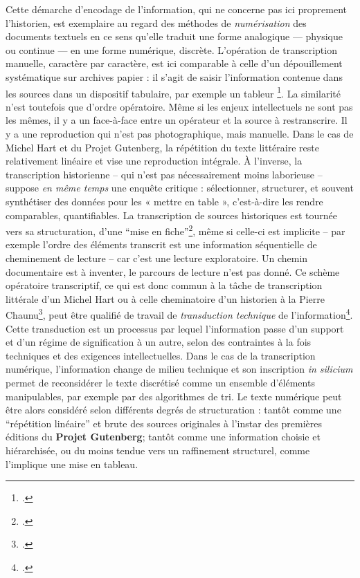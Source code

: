 Cette démarche d'encodage de l'information, qui ne concerne pas ici proprement l’historien, est exemplaire au regard des méthodes de \emph{numérisation} des documents textuels en ce sens qu’elle traduit une forme analogique — physique ou continue — en une forme numérique, discrète. L’opération de transcription manuelle, caractère par caractère, est ici comparable à celle d’un dépouillement systématique sur archives papier : il s’agit de saisir l’information contenue dans les sources dans un dispositif tabulaire, par exemple un tableur \footcite[][]{zalc}. La similarité n’est toutefois que d’ordre opératoire. Même si les enjeux intellectuels ne sont pas les mêmes, il y a un face-à-face entre un opérateur et la source à restranscrire. Il y a une reproduction qui n'est pas photographique, mais manuelle. Dans le cas de Michel Hart et du Projet Gutenberg, la répétition du texte littéraire reste relativement linéaire et vise une reproduction intégrale. À l’inverse, la transcription historienne -- qui n'est pas nécessairement moins laborieuse -- suppose \emph{en même temps} une enquête critique : sélectionner, structurer, et souvent synthétiser des données pour les « mettre en table », c’est-à-dire les rendre comparables, quantifiables. La transcription de sources historiques est tournée vers sa structuration, d'une \enquote{mise en fiche}\footcite[][]{bertfiche}, même si celle-ci est implicite -- par exemple l'ordre des éléments transcrit est une information séquentielle de cheminement de lecture -- car c'est une lecture exploratoire. Un chemin documentaire est à inventer, le parcours de lecture n'est pas donné. Ce schème opératoire transcriptif, ce qui est donc commun à la tâche de transcription littérale d'un Michel Hart ou à celle cheminatoire d'un historien à la Pierre Chaunu\footcite[][]{muller}, peut être qualifié de travail de \emph{transduction technique} de l'information\footcite[][p. 76]{chatonsky}. Cette transduction est un processus par lequel l’information passe d’un support et d’un régime de signification à un autre, selon des contraintes à la fois techniques et des exigences intellectuelles. Dans le cas de la transcription numérique, l'information change de milieu technique et son inscription \emph{in silicium} permet de reconsidérer le texte discrétisé comme un ensemble d'éléments manipulables, par exemple par des algorithmes de tri. Le texte numérique peut être alors considéré selon différents degrés de structuration : tantôt comme une \enquote{répétition linéaire} et brute des sources originales à l'instar des premières éditions du \textbf{Projet Gutenberg}; tantôt comme une information choisie et hiérarchisée, ou du moins tendue vers un raffinement structurel, comme l'implique une mise en tableau.

